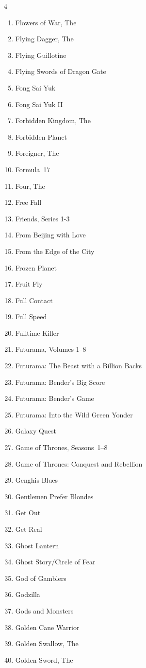 \documentclass{article}
\begin{document}
\begin{multicols}{4}
\begin{enumerate}
\item Flowers of War, The
\item Flying Dagger, The
\item Flying Guillotine
\item Flying Swords of Dragon Gate
\item Fong Sai Yuk
\item Fong Sai Yuk II
\item Forbidden Kingdom, The
\item Forbidden Planet
\item Foreigner, The
\item Formula~17
\item Four, The
\item Free Fall
\item Friends, Series 1-3
\item From Beijing with Love
\item From the Edge of the City
\item Frozen Planet
\item Fruit Fly
\item Full Contact
\item Full Speed
\item Fulltime Killer
\item Futurama, Volumes 1--8
\item Futurama: The Beast with a Billion Backs
\item Futurama: Bender's Big Score
\item Futurama: Bender's Game
\item Futurama: Into the Wild Green Yonder
\item Galaxy Quest
\item Game of Thrones, Seasons~1--8
\item Game of Thrones: Conquest and Rebellion
\item Genghis Blues
\item Gentlemen Prefer Blondes
\item Get Out
\item Get Real
\item Ghost Lantern
\item Ghost Story/Circle of Fear
\item God of Gamblers
\item Godzilla
\item Gods and Monsters
\item Golden Cane Warrior
\item Golden Swallow, The
\item Golden Sword, The

\end{enumerate}
\end{multicols}
\end{document}
